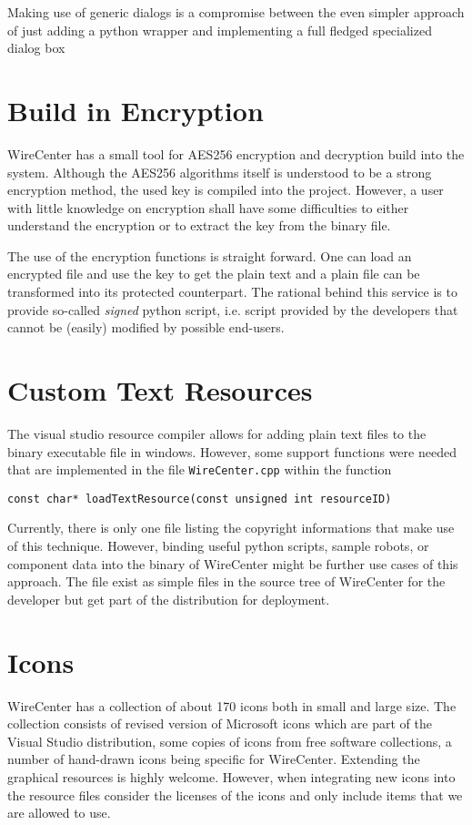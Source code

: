 \documentclass[11pt,a4paper,onepage,openany]{book}
\begin{document}
Making use of generic dialogs is a compromise between the even simpler approach
of just adding a python wrapper and implementing a full fledged specialized
dialog box

\section{Build in Encryption}
WireCenter has a small tool for AES256 encryption and decryption build into the
system. Although the AES256 algorithms itself is understood to be a strong
encryption method, the used key is compiled into the project. However, a user
with little knowledge on encryption shall have some difficulties to either
understand the encryption or to extract the key from the binary file.

The use of the encryption functions is straight forward. One can load an
encrypted file and use the key to get the plain text and a plain file can be
transformed into its protected counterpart. The rational behind this service is
to provide so-called \emph{signed} python script, i.e. script provided by the
developers that cannot be (easily) modified by possible end-users.

\section{Custom Text Resources}
The visual studio resource compiler allows for adding plain text files to the
binary executable file in windows. However, some support functions were needed
that are implemented in the file \texttt{WireCenter.cpp} within the function
\begin{verbatim}
const char* loadTextResource(const unsigned int resourceID)
\end{verbatim}
Currently, there is only one file listing the copyright informations that make
use of this technique. However, binding useful python scripts, sample robots,
or component data into the binary of WireCenter might be further use cases of
this approach. The file exist as simple files in the source tree of WireCenter
for the developer but get part of the distribution for deployment.

\section{Icons}
WireCenter has a collection of about 170 icons both in small and large size.
The collection consists of revised version of Microsoft icons which are part of
the Visual Studio distribution, some copies of icons from free software
collections, a number of hand-drawn icons being specific for WireCenter.
Extending the graphical resources is highly welcome. However, when integrating
new icons into the resource files consider the licenses of the icons and only
include items that we are allowed to use.
\end{document}
